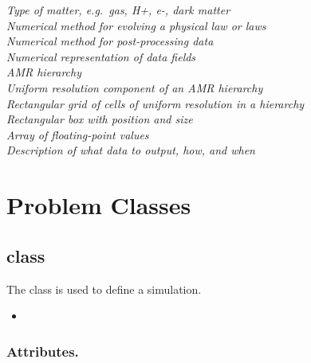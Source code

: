 \documentclass{book}
\begin{document}
\begin{tabbing}
 \>\>\>          \>\> \textit{Type of matter, e.g.~gas, H+, e-, dark matter} \\
 \>\>            \>\>\> \textit{Numerical method for evolving a physical law or laws} \\
 \>\>          \>\>\> \textit{Numerical method for post-processing data} \\
 \>\>              \>\>\> \textit{Numerical representation of data fields} \\
 \>\>\>         \>\> \textit{AMR hierarchy} \\
 \>\>\>             \>\> \textit{Uniform resolution component of an AMR hierarchy} \\
 \>\>\>             \>\> \textit{Rectangular grid of cells of uniform resolution in a hierarchy} \\
 \>\>\>\>               \> \textit{Rectangular box with position and size} \\
 \>\>\>\>             \> \textit{Array of floating-point values} \\
 \>\>            \>\>\> \textit{Description of what data to output, how, and when}
\end{tabbing}


\chapter{Problem Classes} \label{s:problem-classes}

\section{ class}

The  class is used to define a simulation.  
\begin{itemize}
\item {}
\end{itemize}

\subsection{Attributes.}
\end{document}
